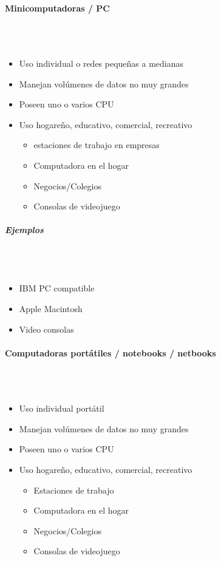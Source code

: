 \paragraph{Minicomputadoras / PC}\mbox{}\\\\%
\begin{itemize}
\item Uso individual o redes pequeñas a medianas
\item Manejan volúmenes de datos no muy grandes
\item Poseen uno o varios CPU
\item Uso hogareño, educativo, comercial, recreativo
	\begin{itemize}
	\item estaciones de trabajo en empresas
	\item Computadora en el hogar
	\item Negocios/Colegios
	\item Consolas de videojuego
	\end{itemize}
\end{itemize}

\subparagraph{Ejemplos}\mbox{}\\\\
\begin{itemize}
\item IBM PC compatible
\item Apple Macintosh
\item Video consolas
\end{itemize}

\paragraph{Computadoras portátiles / notebooks / netbooks}\mbox{}\\\\%
\begin{itemize}
\item Uso individual portátil
\item Manejan volúmenes de datos no muy grandes
\item Poseen uno o varios CPU
\item Uso hogareño, educativo, comercial, recreativo
	\begin{itemize}
	\item Estaciones de trabajo
	\item Computadora en el hogar
	\item Negocios/Colegios
	\item Consolas de videojuego
	\end{itemize}
\end{itemize}


